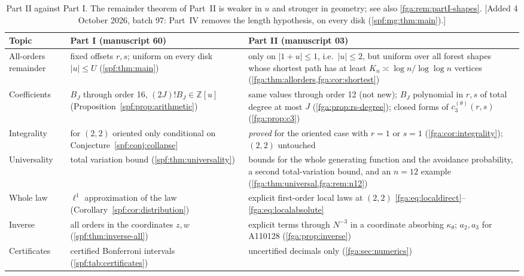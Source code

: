 \documentclass[11pt]{article}
\numberwithin{equation}{section}
\theoremstyle{definition}
\theoremstyle{remark}
\theoremstyle{definition}
\newcommand{\Z}{\mathbb Z}
\begin{document}
\begin{table}[htbp]
\centering\small
\renewcommand{\arraystretch}{1.15}
\begin{tabular}{@{}>{\raggedright\arraybackslash}p{}>{\raggedright\arraybackslash}p{}>{\raggedright\arraybackslash}p{}@{}}
\toprule
Topic & Part I (manuscript 60) & Part II (manuscript 03)\\
\midrule
All-orders remainder &
fixed offsets $r,s$; uniform on every disk $|u|\le U$
(\cref{spf:thm:main}) &
only on $|1+u|\le1$, i.e.\ $|u|\le2$, but uniform over all forest shapes
whose shortest path has at least $K_n\asymp\log n/\log\log n$ vertices
(\cref{fga:thm:allorders,fga:cor:shortest})\\
Coefficients &
$B_J$ through order 16, $(2J)!B_J\in\Z[u]$ (Proposition~\ref{spf:prop:arithmetic}) &
same values through order 12 (not new); $B_J$ polynomial in $r,s$ of total
degree at most $J$ (\cref{fga:prop:rs-degree}); closed forms of
$c_3^{(\theta)}(r,s)$ (\cref{fga:prop:c3})\\
Integrality &
for $(2,2)$ oriented only conditional on Conjecture~\ref{spf:conj:collapse} &
\emph{proved} for the oriented case with $r=1$ or $s=1$
(\cref{fga:cor:integrality}); $(2,2)$ untouched\\
Universality &
total variation bound (\cref{spf:thm:universality}) &
bounds for the whole generating function and the avoidance probability,
a second total-variation bound, and an $n=12$ example
(\cref{fga:thm:universal,fga:rem:n12})\\
Whole law &
$\ell^1$ approximation of the law (Corollary~\ref{spf:cor:distribution}) &
explicit first-order local laws at $(2,2)$ \eqref{fga:eq:localdirect}--\eqref{fga:eq:localabsolute}\\
Inverse &
all orders in the coordinates $z,w$ (\cref{spf:thm:inverse-all}) &
explicit terms through $N^{-3}$ in a coordinate absorbing $\kappa_\theta$;
$a_2,a_3$ for A110128 (\cref{fga:prop:inverse})\\
Certificates &
certified Bonferroni intervals (\cref{spf:tab:certificates}) &
uncertified decimals only (\cref{fga:sec:numerics})\\
\bottomrule
\end{tabular}
\caption{Part II against Part I. The remainder theorem of Part~II is weaker
in $u$ and stronger in geometry; see also \cref{fga:rem:partI-shapes}.
[Added 4 October 2026, batch 97: Part~IV removes the length hypothesis, on
every disk (\cref{spf:mg:thm:main}).]}
\label{fga:tab:claims}
\end{table}
\end{document}
